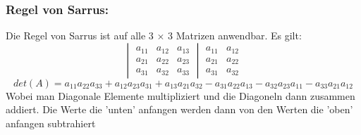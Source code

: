 \documentclass[a4paper,10pt]{scrartcl}
\begin{document}
        \subsubsection*{Regel von Sarrus:}
            Die Regel von Sarrus ist auf alle 3 $\times$ 3 Matrizen anwendbar. Es gilt:
            \[
                \begin{vmatrix}
                    a_{11} & a_{12} & a_{13} \\
                    a_{21} & a_{22} & a_{23} \\
                    a_{31} & a_{32} & a_{33} 
                \end{vmatrix}  
                \begin{matrix}
                    a_{11} & a_{12} \\
                    a_{21} & a_{22} \\
                    a_{31} & a_{32} 
                \end{matrix}
            \]
            \[
                det(A) = a_{11}a_{22}a_{33} + a_{12}a_{23}a_{31} + a_{13}a_{21}a_{32} - a_{31}a_{22}a_{13} - a_{32}a_{23}a_{11} - a_{33}a_{21}a_{12}
            \]
        Wobei man Diagonale Elemente multipliziert und die Diagoneln dann zusammen addiert. Die Werte die 'unten' anfangen werden dann von den Werten die 'oben' anfangen subtrahiert
        
\end{document}
